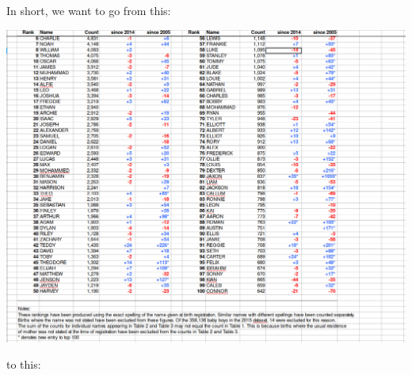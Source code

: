 \documentclass[
]{book}
\begin{document}
In short, we want to go from this:

\includegraphics{R/RDataWrangling/images/messy.png}

to this:
\end{document}
